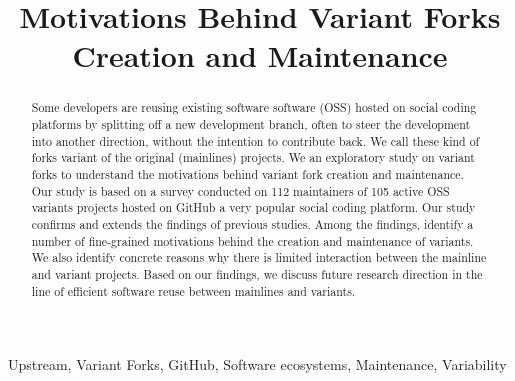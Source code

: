 \documentclass[10pt,conference]{IEEEtran}
\newcommand{\gh}{GitHub\xspace}
\begin{document}
\title{Motivations Behind Variant Forks Creation and Maintenance}


\maketitle

\begin{abstract}
Some developers are reusing existing software software (OSS) hosted on social coding platforms by splitting off a new development branch, often to steer the development into another direction, without the intention to  contribute back. We call these kind of forks variant of the original (mainlines) projects.
We an exploratory study on variant forks to understand the motivations behind variant fork creation and maintenance. Our study is based on a survey conducted on 112 maintainers of 105 active OSS
variants projects hosted on \gh a very popular social coding platform.
Our study confirms and extends the findings of previous studies. Among the findings, identify a number of fine-grained motivations behind the creation and maintenance of variants. We also identify concrete reasons why there is limited interaction between the mainline and variant projects. Based on our findings, we discuss future research direction in the line of efficient software reuse between mainlines and variants.
\end{abstract}

\begin{IEEEkeywords}
Upstream, Variant Forks, GitHub, Software ecosystems, Maintenance, Variability
\end{IEEEkeywords}










\typeout{}

\end{document}
